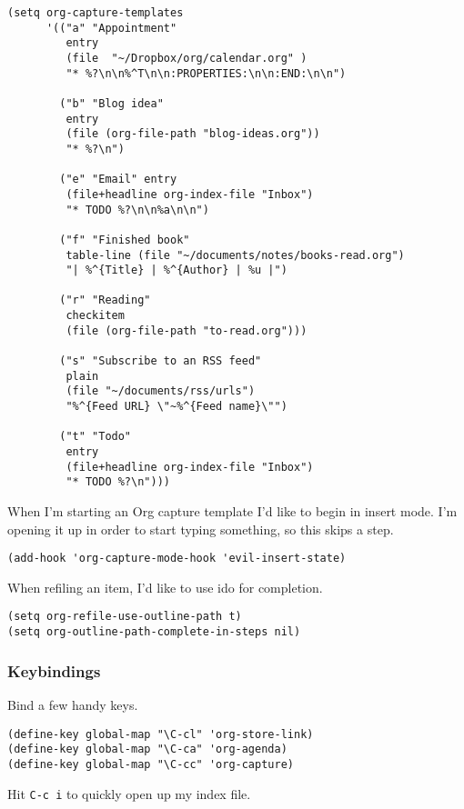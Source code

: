 \documentclass[11pt]{article}
\begin{document}
\begin{verbatim}
(setq org-capture-templates
      '(("a" "Appointment"
         entry
         (file  "~/Dropbox/org/calendar.org" )
         "* %?\n\n%^T\n\n:PROPERTIES:\n\n:END:\n\n")

        ("b" "Blog idea"
         entry
         (file (org-file-path "blog-ideas.org"))
         "* %?\n")

        ("e" "Email" entry
         (file+headline org-index-file "Inbox")
         "* TODO %?\n\n%a\n\n")

        ("f" "Finished book"
         table-line (file "~/documents/notes/books-read.org")
         "| %^{Title} | %^{Author} | %u |")

        ("r" "Reading"
         checkitem
         (file (org-file-path "to-read.org")))

        ("s" "Subscribe to an RSS feed"
         plain
         (file "~/documents/rss/urls")
         "%^{Feed URL} \"~%^{Feed name}\"")

        ("t" "Todo"
         entry
         (file+headline org-index-file "Inbox")
         "* TODO %?\n")))
\end{verbatim}

When I'm starting an Org capture template I'd like to begin in insert mode. I'm
opening it up in order to start typing something, so this skips a step.

\begin{verbatim}
(add-hook 'org-capture-mode-hook 'evil-insert-state)
\end{verbatim}

When refiling an item, I'd like to use ido for completion.

\begin{verbatim}
(setq org-refile-use-outline-path t)
(setq org-outline-path-complete-in-steps nil)
\end{verbatim}
\subsubsection{Keybindings}
\label{sec:orgbaefc77}

Bind a few handy keys.

\begin{verbatim}
(define-key global-map "\C-cl" 'org-store-link)
(define-key global-map "\C-ca" 'org-agenda)
(define-key global-map "\C-cc" 'org-capture)
\end{verbatim}

Hit \texttt{C-c i} to quickly open up my index file.
\end{document}
